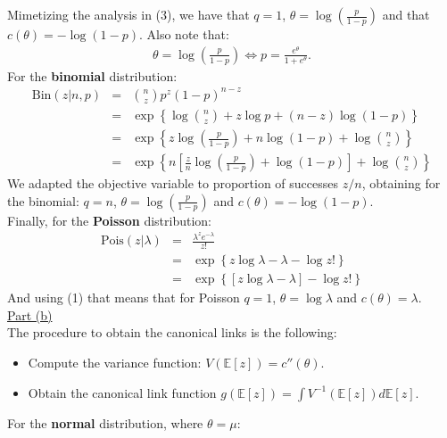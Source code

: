 \documentclass[a4paper, 11pt]{article}
\begin{document}
Mimetizing the analysis in (3), we have that $q=1$, $\theta = \log \left( \frac{p}{1-p} \right)$ and that $c(\theta) = -\log{(1-p)}$. Also note that:
\begin{eqnarray}
\theta = \log \left( \frac{p}{1-p} \right) \Leftrightarrow p = \frac{e^\theta}{1 + e^\theta}.
\end{eqnarray}
For the \textbf{binomial} distribution:
\begin{eqnarray}
\text{Bin}(z | n,p) &=& {n \choose z} p^z (1-p)^{n-z}   \nonumber \\
&=& \exp \left\{ \log{n \choose z} + z \log p + (n-z) \log{(1-p)} \right\} \nonumber \\
&=& \exp \left\{ z \log \left( \frac{p}{1-p} \right) + n \log{(1-p)} + \log{n \choose z} \right\} \nonumber \\
&=& \exp \left\{ n \left[ \frac{z}{n} \log\left( \frac{p}{1-p} \right) + \log{(1-p)} \right] + \log{n \choose z} \right\} \nonumber
\end{eqnarray}
We adapted the objective variable to proportion of successes $z/n$, obtaining for the binomial: $q=n$, $\theta = \log \left( \frac{p}{1-p} \right)$ and $c(\theta) = -\log{(1-p)}$.\\
\newline Finally, for the \textbf{Poisson} distribution:
\begin{eqnarray}
\text{Pois}(z | \lambda) &=& \frac{\lambda^z e^{-\lambda}}{z!} \nonumber \\
&=& \exp \left\{ z \log \lambda - \lambda - \log z! \right\} \nonumber \\
&=& \exp \left\{ [z \log \lambda - \lambda] - \log z! \right\} \nonumber
\end{eqnarray}
And using (1) that means that for Poisson $q = 1$, $\theta = \log \lambda$ and $c(\theta) =\lambda$.\\
\newline \underline{Part (b)}\\
\newline The procedure to obtain the canonical links is the following:
\begin{itemize}
\item Compute the variance function: $V(\mathbb{E}[z]) = c''(\theta)$.
\item Obtain the canonical link function $g(\mathbb{E}[z]) = \int V^{-1}(\mathbb{E}[z]) d\mathbb{E}[z]$.
\end{itemize}
For the \textbf{normal} distribution, where $\theta = \mu$:
\end{document}
